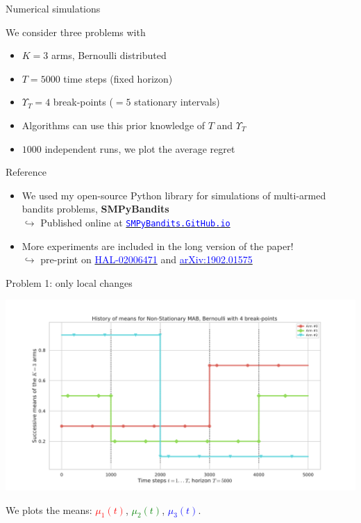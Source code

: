 \documentclass[11pt,english,ignorenonframetext,]{beamer}
\begin{document}
\begin{frame}{Numerical simulations}

  \begin{block}{We consider three problems with}
    \begin{itemize}
      \item
      $K=3$ arms, Bernoulli distributed
      \item
      $T=5000$ time steps (fixed horizon)
      \item
      $\Upsilon_T=4$ break-points ($=5$ stationary intervals)
      \item
      Algorithms can use this prior knowledge of $T$ and $\Upsilon_T$
      \item
      $1000$ independent runs, we plot the average regret
    \end{itemize}
  \end{block}

  \begin{exampleblock}{Reference}
    \begin{itemize}
      \item
      We used my open-source Python library for simulations of multi-armed bandits problems, \textbf{SMPyBandits}\\
      $\hookrightarrow$ Published online at \href{https://SMPyBandits.GitHub.io}{\textcolor{blue}{\texttt{SMPyBandits.GitHub.io}}}
      \item
      More experiments are included in the long version of the paper!\\
      $\hookrightarrow$ pre-print on
      \href{https://hal.inria.fr/hal-02006471}{\textcolor{blue}{HAL-02006471}}
      and
      \href{https://arxiv.org/abs/1902.01575}{\textcolor{blue}{arXiv:1902.01575}}
    \end{itemize}
  \end{exampleblock}

\end{frame}


\begin{frame}[plain]{Problem 1: only local changes}
  \begin{center}
    \includegraphics[width=1.15\textwidth]{figures/Problem_1.pdf}
  \end{center}
  We plots the means:
  \textcolor{red}{$\mu_1(t)$},
  \textcolor{green}{$\mu_2(t)$},
  \textcolor{blue}{$\mu_3(t)$}.
\end{frame}
\end{document}
